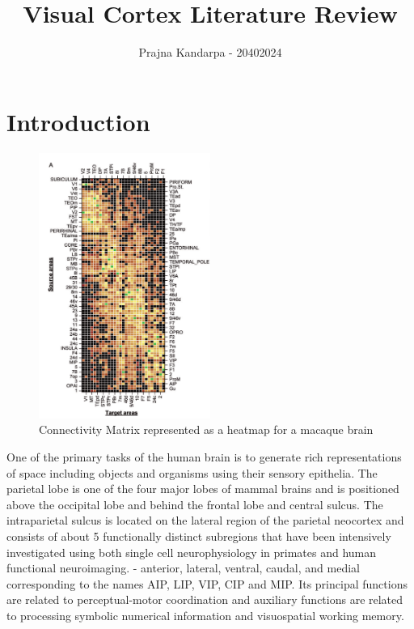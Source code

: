 \documentclass[10pt,oneside,final]{article}
\title{Visual Cortex Literature Review}
\author{Prajna Kandarpa - 20402024}
\begin{document}
    \maketitle
    \section{Introduction} 
        \begin{figure}
            \centering
            \includegraphics[width=0.5\textwidth]{area_heatmap}
            \caption{Connectivity Matrix represented as a heatmap for a macaque brain \cite{Markov2014}}
            \label{fig:heat}
        \end{figure}
        One of the primary tasks of the human brain is to generate rich representations of space including objects and organisms using their sensory epithelia\cite{Duhamel1998}. The parietal lobe is one of the four major lobes of mammal brains and is positioned above the occipital lobe and behind the frontal lobe and central sulcus. The intraparietal sulcus is located on the lateral region of the parietal neocortex and consists of about 5 functionally distinct subregions that have been intensively investigated using both single cell neurophysiology in primates and human functional neuroimaging. - anterior, lateral, ventral, caudal, and medial corresponding to the names AIP, LIP, VIP, CIP and MIP. Its principal functions are related to perceptual-motor coordination and auxiliary functions are related to processing symbolic numerical information and visuospatial working memory. 
\end{document}
